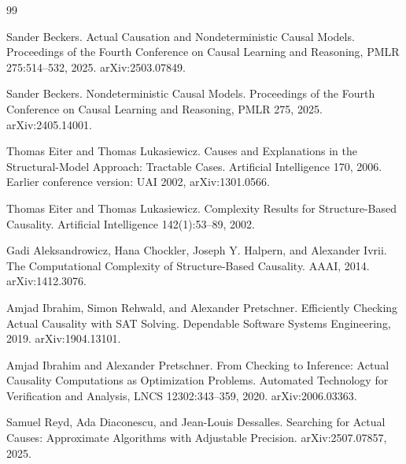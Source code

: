 \documentclass{article}
\begin{document}
\begin{thebibliography}{99}

   Sander Beckers. Actual Causation and Nondeterministic Causal Models. Proceedings of the Fourth Conference on Causal Learning and Reasoning, PMLR 275:514--532, 2025. arXiv:2503.07849.

   Sander Beckers. Nondeterministic Causal Models. Proceedings of the Fourth Conference on Causal Learning and Reasoning, PMLR 275, 2025. arXiv:2405.14001.

   Thomas Eiter and Thomas Lukasiewicz. Causes and Explanations in the Structural-Model Approach: Tractable Cases. Artificial Intelligence 170, 2006. Earlier conference version: UAI 2002, arXiv:1301.0566.

   Thomas Eiter and Thomas Lukasiewicz. Complexity Results for Structure-Based Causality. Artificial Intelligence 142(1):53--89, 2002.

   Gadi Aleksandrowicz, Hana Chockler, Joseph Y. Halpern, and Alexander Ivrii. The Computational Complexity of Structure-Based Causality. AAAI, 2014. arXiv:1412.3076.

   Amjad Ibrahim, Simon Rehwald, and Alexander Pretschner. Efficiently Checking Actual Causality with SAT Solving. Dependable Software Systems Engineering, 2019. arXiv:1904.13101.

   Amjad Ibrahim and Alexander Pretschner. From Checking to Inference: Actual Causality Computations as Optimization Problems. Automated Technology for Verification and Analysis, LNCS 12302:343--359, 2020. arXiv:2006.03363.

   Samuel Reyd, Ada Diaconescu, and Jean-Louis Dessalles. Searching for Actual Causes: Approximate Algorithms with Adjustable Precision. arXiv:2507.07857, 2025.

\end{thebibliography}
\end{document}
